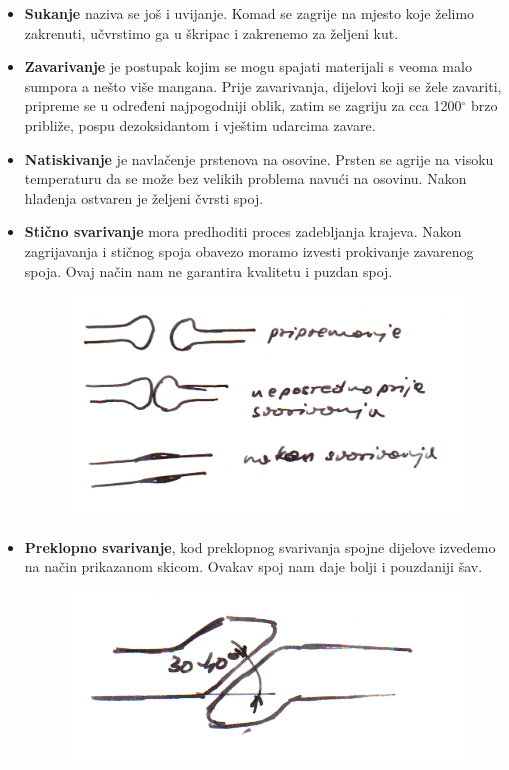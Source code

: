 \documentclass[a4paper,12pt]{article}
\numberwithin{figure}{section}
\begin{document}
\begin{itemize}
\item \textbf{Sukanje} naziva se još i uvijanje. Komad se zagrije na mjesto koje želimo zakrenuti, učvrstimo ga u škripac i zakrenemo za željeni kut.
\item \textbf{Zavarivanje} je postupak kojim se mogu spajati materijali s veoma malo sumpora a nešto više mangana. Prije zavarivanja, dijelovi koji se žele zavariti, pripreme se u određeni najpogodniji oblik, zatim se zagriju za cca 1200$^{\circ}$ brzo približe, pospu dezoksidantom i vještim udarcima zavare.
\item \textbf{Natiskivanje} je navlačenje prstenova na osovine. Prsten se agrije na visoku temperaturu da se može bez velikih problema navući na osovinu. Nakon hlađenja ostvaren je željeni čvrsti spoj.
\item \textbf{Stično svarivanje} mora predhoditi proces zadebljanja krajeva. Nakon zagrijavanja  i stičnog spoja obavezo moramo izvesti prokivanje zavarenog spoja. Ovaj način nam ne garantira kvalitetu i puzdan spoj.
\begin{figure}[!h]
\centering
\includegraphics[scale=0.15]{image_43-1.png}
\end{figure}
\FloatBarrier\item \textbf{Preklopno svarivanje}, kod preklopnog svarivanja spojne dijelove izvedemo na način prikazanom skicom. Ovakav spoj nam daje bolji i pouzdaniji šav.
\begin{figure}[!h]
\centering
\includegraphics[scale=0.15]{image_43-2.png}

\end{figure}
\end{itemize}
\end{document}
